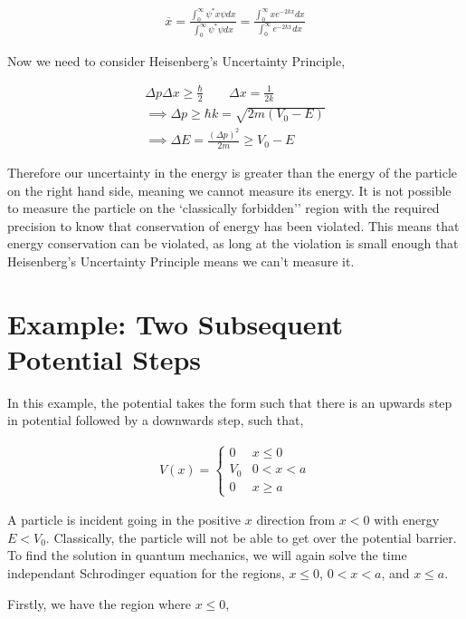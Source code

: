 \documentclass[11pt]{amsart}
\begin{document}
\begin{align*}
  \overline{x} = \frac{\int_0^{\infty} \psi^* x \psi dx}{\int_0^{\infty} \psi^* \psi dx} = \frac{\int_0^{\infty} x e^{-2kx} dx}{\int_0^{\infty} e^{-2kx} dx}
\end{align*}

Now we need to consider Heisenberg's Uncertainty Principle,

\begin{align*}
  \Delta p \Delta x \geq \frac{\hbar}{2} \qquad \Delta x = \frac{1}{2k} \\
  \implies \Delta p \geq \hbar k = \sqrt{2m(V_0 - E)} \\
  \implies \Delta E = \frac{{(\Delta p)}^2}{2m} \geq V_0 - E
\end{align*}

Therefore our uncertainty in the energy is greater than the energy of the particle on the right hand side, meaning we cannot measure its energy. It is not possible to measure the particle on the `classically forbidden'' region with the required precision to know that conservation of energy has been violated. This means that energy conservation can be violated, as long at the violation is small enough that Heisenberg's Uncertainty Principle means we can't measure it.

\section{Example: Two Subsequent Potential Steps}

In this example, the potential takes the form such that there is an upwards step in potential followed by a downwards step, such that,

\begin{align*}
  V(x) =
  \begin{cases}
    0 & x \leq 0 \\
    V_0 & 0 < x < a \\
    0 & x \geq a
  \end{cases}
\end{align*}

A particle is incident going in the positive $x$ direction from $x < 0$ with energy $E < V_0$. Classically, the particle will not be able to get over the potential barrier. To find the solution in quantum mechanics, we will again solve the time independant Schrodinger equation for the regions, $x \leq 0$, $0 < x < a$, and $x \leq a$.

Firstly, we have the region where $x \leq 0$,
\end{document}
